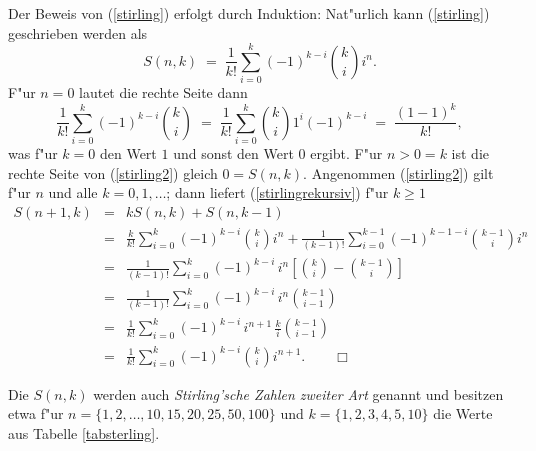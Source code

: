 Der Beweis von (\ref{stirling}) erfolgt durch Induktion:
Nat"urlich kann (\ref{stirling}) geschrieben werden als
\begin{equation}
	\label{stirling2}
	S(n,k) \; = \; \frac{1}{k!} \sum_{i=0}^k (-1)^{k-i} {k \choose i} i^n .
\end{equation}
F"ur $n=0$ lautet die rechte Seite dann
\[
	\frac{1}{k!} \sum_{i=0}^k (-1)^{k-i} {k \choose i} \; = \;
	\frac{1}{k!} \sum_{i=0}^k { k \choose i} 1^i (-1)^{k-i} \; = \;
	\frac{(1-1)^k}{k!},
\]
was f"ur $k=0$ den Wert $1$ und sonst den Wert $0$ ergibt. F"ur $n>0=k$ ist
die rechte Seite von (\ref{stirling2}) gleich $0 = S(n,k)$. 
Angenommen (\ref{stirling2}) gilt f"ur $n$ und alle $k=0,1,\dots$;
dann liefert (\ref{stirlingrekursiv}) f"ur $k \geq 1$
\begin{eqnarray*}
	S(n+1,k) & = & k S(n,k) + S(n,k-1) \\
		 & = & \frac {k}{k!} \sum_{i=0}^k (-1)^{k-i} { k \choose i} i^n
		     + \frac {1}{(k-1)!} \sum_{i=0}^{k-1} (-1)^{k-1-i}
		       {k-1 \choose i} i^n \\
		 & = & \frac {1}{(k-1)!} \sum_{i=0}^k (-1)^{k-i} \,i^n
		       \left[{k \choose i} - { k-1 \choose i} \right] \\
		 & = & \frac {1}{(k-1)!} \sum_{i=0}^k (-1)^{k-i} \,i^n
		       {k-1 \choose i-1}  \\
		 & = & \frac {1}{k!} \sum_{i=0}^k (-1)^{k-i} \,i^{n+1}
		       \,\frac ki {k-1 \choose i-1}  \\
		 & = & \frac {1}{k!} \sum_{i=0}^k (-1)^{k-i} 
		       {k \choose i} i^{n+1}. \quad\quad\Box 
\end{eqnarray*}
\vspace*{0.5cm}

Die $S(n, k)$ werden auch {\em Stirling'sche Zahlen zweiter Art} genannt
und besitzen etwa f"ur $n = \{1,2,\dots,10,15,20,25,50,100\}$ und 
$k = \{1,2,3,4,5,10\}$ die Werte aus Tabelle \ref{tabsterling}.


